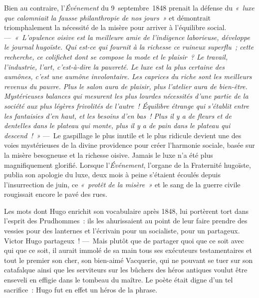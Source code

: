 \documentclass[french,twoside]{book} %
\begin{document}
Bien au contraire, l’\emph{Événement} du 9 septembre 1848 prenait la défense du \emph{« luxe que calomniait la  
\label{p42}fausse philanthropie de nos jours »} et démontrait triomphalement la nécessité de la misère pour arriver à l’équilibre social. — \emph{« L’opulence oisive est la meilleure amie de l’indigence laborieuse, développe le journal hugoïste. Qui est-ce qui fournit à la richesse ce ruineux superflu ; cette recherche, ce colifichet dont se compose la mode et le plaisir ? Le travail, l’industrie, l’art, c’est-à-dire la pauvreté. Le luxe est la plus certaine des aumônes, c’est une aumône involontaire. Les caprices du riche sont les meilleurs revenus du pauvre. Plus le salon aura de plaisir, plus l’atelier aura de bien-être. Mystérieuses balances qui mesurent les plus lourdes nécessités d’une partie de la société aux plus légères frivolités de l’autre ! Équilibre étrange qui s’établit entre les fantaisies d’en haut, et les besoins d’en bas ! Plus il y a de fleurs et de dentelles dans le plateau qui monte, plus il y a de pain dans le plateau qui descend ! »} — Le gaspillage le plus inutile et le plus ridicule devient une des voies mystérieuses de la divine providence pour créer l’harmonie sociale, basée sur la misère besogneuse et la richesse oisive. Jamais le luxe n’a été plus magnifiquement glorifié. Lorsque l’\emph{Événement}, l’organe de la Fraternité hugoïste, publia son apologie du luxe, deux mois à peine s’étaient écoulés depuis l’insurrection de juin, ce \emph{« protêt de la misère »} et le sang de la guerre civile rougissait encore le pavé des rues.\par
Les mots dont Hugo enrichit son vocabulaire après 1848, lui portèrent tort dans l’esprit des Prudhommes : ils les ahurissaient au point de leur faire prendre des vessies pour des lanternes et l’écrivain  
\label{p43}pour un socialiste, pour un partageux. Victor Hugo partageux ! — Mais plutôt que de partager quoi que ce soit avec qui que ce soit, il aurait immolé de sa main tous ses exécuteurs testamentaires et tout le premier son cher, son bien-aimé Vacquerie, qui ne pouvant se tuer sur son catafalque ainsi que les serviteurs sur les bûchers des héros antiques voulut être enseveli en effigie dans le tombeau du maître. Le poète était digne d’un tel sacrifice : Hugo fut en effet un héros de la phrase.\par
\end{document}
